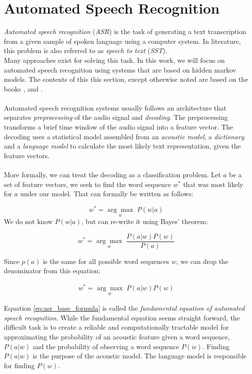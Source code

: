 
\section{Automated Speech Recognition}
\label{ch:HMM_ASR}
\textit{Automated speech recognition} (\textit{ASR}) is the task of generating a text transcription from a given sample of spoken language using a computer system. In literature, this problem is also referred to as \textit{speech to text} (\textit{SST}). \\
Many approaches exist for solving this task. In this work, we will focus on automated speech recognition using systems that are based on hidden markov models. The contents of this this section, except otherwise noted are based on the books \cite{schukat1995automatische}, \cite{huang2001spoken} and \cite{yu2016automatic}. \\ \\
Automated speech recognition systems usually follows an architecture that separates \textit{preprocessing} of the audio signal and \textit{decoding}. The preprocessing transforms a brief time window of the audio signal into a feature vector. The decoding uses a statistical model assembled from an \textit{acoustic model}, a \textit{dictionary} and a \textit{language model} to calculate the most likely text representation, given the feature vectors.\\ \\

More formally, we can treat the decoding as a classification problem. Let $a$ be a set of feature vectors, we seek to find the word sequence $w^*$ that was most likely for $a$ under our model. That can formally be written as follows:

\[
w^* = \underset{w}{\arg \max} \; P(w|a)
\] 
We do not know $P(w|a)$, but can re-write it using Bayes' theorem:

\[
w^* = \underset{w}{\arg \max} \; \frac{P(a|w) P(w)}{P(a)}
\]

Since $p(a)$ is the same for all possible word sequences $w$, we can drop the denominator from this equation:

\begin{align}
w^* = \underset{w}{\arg \max} \; P(a|w) P(w)
\label{eq:asr_base_formula}
\end{align}

Equation \ref{eq:asr_base_formula} is called the \textit{fundamental equation of automated speech recognition}. While the fundamental equation seems straight forward, the difficult task is to create a reliable and computationally tractable model for approximating the probability of an acoustic feature given a word sequence, $P(a|w)$ and the probability of observing a word sequence $P(w)$. Finding $P(a|w)$ is the purpose of the acoustic model. The language model is responsible for finding $P(w)$. 

